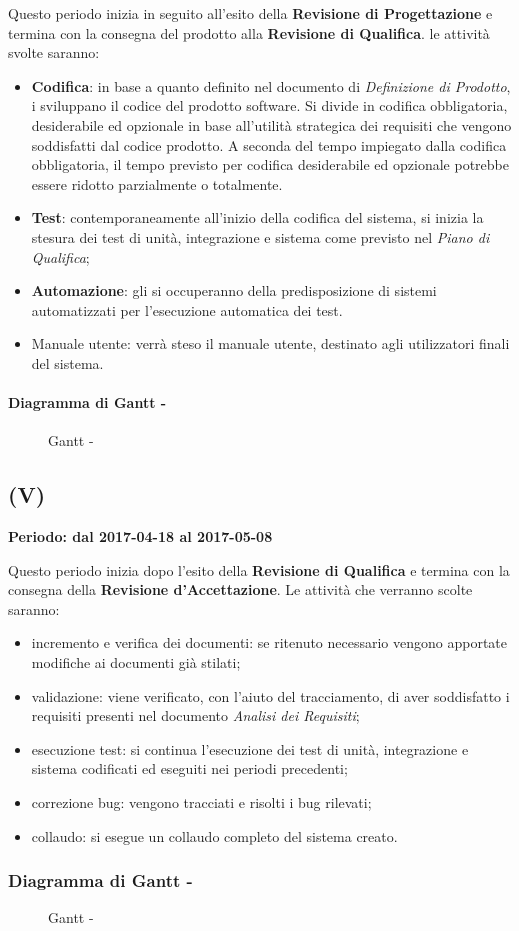 \documentclass[./PianoDiProgetto.tex]{subfiles}
\begin{document}
  Questo periodo inizia in seguito all'esito della \textbf{Revisione di Progettazione} e termina con la consegna del prodotto alla \textbf{Revisione di Qualifica}. le attività svolte saranno:
  \begin{itemize}
    \item \textbf{Codifica}: in base a quanto definito nel documento di \textit{Definizione di Prodotto}, i \PRP{} sviluppano il codice del prodotto software. Si divide in codifica obbligatoria, desiderabile ed opzionale in base all'utilità strategica dei requisiti che vengono soddisfatti dal codice prodotto. A seconda del tempo impiegato dalla codifica obbligatoria, il tempo previsto per codifica desiderabile ed opzionale potrebbe essere ridotto parzialmente o totalmente.
    \item \textbf{Test}: contemporaneamente all'inizio della codifica del sistema, si inizia la stesura dei test di unità, integrazione e sistema come previsto nel \textit{Piano di Qualifica};
    \item \textbf{Automazione}: gli \AMMP{} si occuperanno della predisposizione di sistemi automatizzati per l'esecuzione automatica dei test.
    \item {Manuale utente}: verrà steso il manuale utente, destinato agli utilizzatori finali del sistema.
  \end{itemize}

  \paragraph{Diagramma di Gantt - \PerC}
    \begin{figure}[!h]
    \centering
    \caption{Gantt - \PerC}
    \end{figure}

  \subsection{\PerV (V)}
  \textbf{Periodo: dal 2017-04-18 al 2017-05-08}

  Questo periodo inizia dopo l'esito della \textbf{Revisione di Qualifica} e termina con la consegna della \textbf{Revisione d'Accettazione}. Le attività che verranno scolte saranno:
  \begin{itemize}
    \item incremento e verifica dei documenti: se ritenuto necessario vengono apportate modifiche ai documenti già stilati;
    \item validazione: viene verificato, con l'aiuto del tracciamento, di aver soddisfatto i requisiti presenti nel documento \textit{Analisi dei Requisiti};
    \item esecuzione test: si continua l'esecuzione dei test di unità, integrazione e sistema codificati ed eseguiti nei periodi precedenti;
    \item correzione bug: vengono tracciati e risolti i bug rilevati;
    \item collaudo: si esegue un collaudo completo del sistema creato.
  \end{itemize}

  \subsubsection{Diagramma di Gantt - \PerV}
    \begin{figure}[!h]
    \centering
    \caption{Gantt - \PerV}
    \end{figure}
\end{document}
